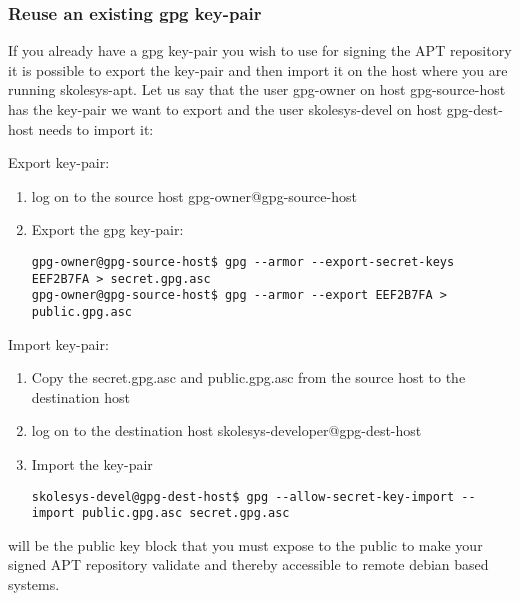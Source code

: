 \subsubsection{Reuse an existing gpg key-pair\label{skolesys-apt-reusegpg}}
If you already have a gpg key-pair you wish to use for signing the APT repository it is possible to export the key-pair and then import it on the host where you are running skolesys-apt.
Let us say that the user gpg-owner on host gpg-source-host has the key-pair we want to export and the user skolesys-devel on host gpg-dest-host needs to import it:

Export key-pair:
\begin{enumerate}
 \item log on to the source host gpg-owner@gpg-source-host
 \item Export the gpg key-pair:
\begin{verbatim}
gpg-owner@gpg-source-host$ gpg --armor --export-secret-keys EEF2B7FA > secret.gpg.asc
gpg-owner@gpg-source-host$ gpg --armor --export EEF2B7FA > public.gpg.asc
\end{verbatim}
\end{enumerate}

Import key-pair:

\begin{enumerate}
 \item Copy the secret.gpg.asc and public.gpg.asc from the source host to the destination host
 \item log on to the destination host skolesys-developer@gpg-dest-host
 \item Import the key-pair
\begin{verbatim}
skolesys-devel@gpg-dest-host$ gpg --allow-secret-key-import --import public.gpg.asc secret.gpg.asc
\end{verbatim}
\end{enumerate}

 will be the public key block that you must expose to the public to make your signed APT repository validate and thereby accessible to remote debian based systems.

